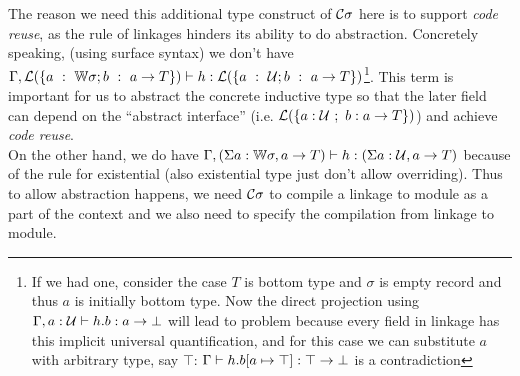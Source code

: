 The reason we need this additional type construct of ${\mathcal{C}}\sigma$ here is
to support \textit{code reuse}, as the rule of linkages hinders its
ability to do abstraction. Concretely speaking, (using surface syntax)
we don't have \\ ${ {\Gamma, {\mathcal{L}}(\{a~:~{\mathbb{W}} \sigma; b~:~a \to
T\})} \vdash {h} : {{\mathcal{L}}(\{a~:~{\mathcal{U}}; b~:~a \to T\})} }$\footnote{If we had one,
consider the case $T$ is bottom type and $\sigma$ is empty record and
thus $a$ is initially bottom type. Now the direct projection using  ${ {\Gamma, a : {\mathcal{U}}} \vdash {h.b} : {a \to \bot} }$ will lead to problem because every field in linkage has this implicit universal quantification, and for this case we can substitute $a$ with arbitrary type, say $\top$: ${ {\Gamma} \vdash {h.b[a \mapsto \top]} : {\top \to \bot} }$ is a contradiction}. This term is important for us to abstract the
concrete inductive type so that the later field can depend on the
``abstract interface'' (i.e. ${\mathcal{L}}(\{a:{\mathcal{U}}~;~b:a \to T\})$) and achieve \textit{code reuse}. \\ On the other hand,
we do have ${ {\Gamma, (\Sigma a : {\mathbb{W}}\sigma, a \to T)
} \vdash {h} : {(\Sigma a : {\mathcal{U}}, a \to T)} }$ because of the rule for existential
(also existential type just don't allow overriding).
Thus to allow abstraction happens, we need ${\mathcal{C}}\sigma$ to compile a
linkage to module as a part of the context and we also need
 to specify the compilation from linkage to
module.

